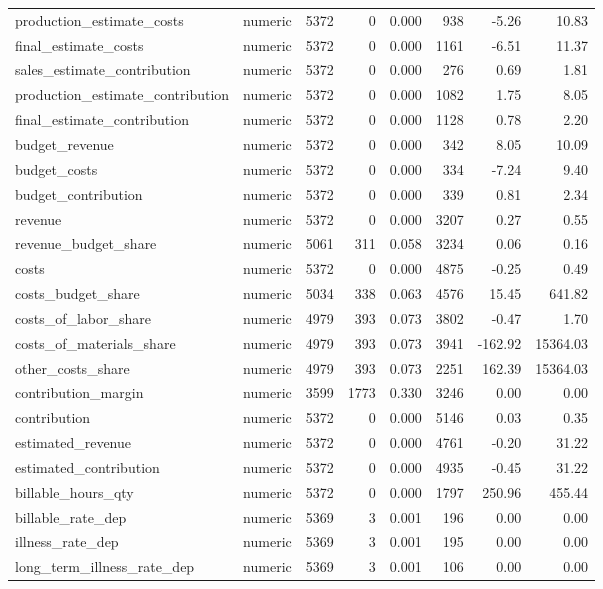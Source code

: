 \begin{landscape}
\begin{longtable}[t]{llrrrrrr}
production\_estimate\_costs & numeric & 5372 & 0 & 0.000 & 938 & -5.26 & 10.83\\
final\_estimate\_costs & numeric & 5372 & 0 & 0.000 & 1161 & -6.51 & 11.37\\
sales\_estimate\_contribution & numeric & 5372 & 0 & 0.000 & 276 & 0.69 & 1.81\\
production\_estimate\_contribution & numeric & 5372 & 0 & 0.000 & 1082 & 1.75 & 8.05\\
final\_estimate\_contribution & numeric & 5372 & 0 & 0.000 & 1128 & 0.78 & 2.20\\
budget\_revenue & numeric & 5372 & 0 & 0.000 & 342 & 8.05 & 10.09\\
budget\_costs & numeric & 5372 & 0 & 0.000 & 334 & -7.24 & 9.40\\
budget\_contribution & numeric & 5372 & 0 & 0.000 & 339 & 0.81 & 2.34\\
revenue & numeric & 5372 & 0 & 0.000 & 3207 & 0.27 & 0.55\\
revenue\_budget\_share & numeric & 5061 & 311 & 0.058 & 3234 & 0.06 & 0.16\\
costs & numeric & 5372 & 0 & 0.000 & 4875 & -0.25 & 0.49\\
costs\_budget\_share & numeric & 5034 & 338 & 0.063 & 4576 & 15.45 & 641.82\\
costs\_of\_labor\_share & numeric & 4979 & 393 & 0.073 & 3802 & -0.47 & 1.70\\
costs\_of\_materials\_share & numeric & 4979 & 393 & 0.073 & 3941 & -162.92 & 15364.03\\
other\_costs\_share & numeric & 4979 & 393 & 0.073 & 2251 & 162.39 & 15364.03\\
contribution\_margin & numeric & 3599 & 1773 & 0.330 & 3246 & 0.00 & 0.00\\
contribution & numeric & 5372 & 0 & 0.000 & 5146 & 0.03 & 0.35\\
estimated\_revenue & numeric & 5372 & 0 & 0.000 & 4761 & -0.20 & 31.22\\
estimated\_contribution & numeric & 5372 & 0 & 0.000 & 4935 & -0.45 & 31.22\\
billable\_hours\_qty & numeric & 5372 & 0 & 0.000 & 1797 & 250.96 & 455.44\\
billable\_rate\_dep & numeric & 5369 & 3 & 0.001 & 196 & 0.00 & 0.00\\
illness\_rate\_dep & numeric & 5369 & 3 & 0.001 & 195 & 0.00 & 0.00\\
long\_term\_illness\_rate\_dep & numeric & 5369 & 3 & 0.001 & 106 & 0.00 & 0.00\\

\end{longtable}
\end{landscape}
